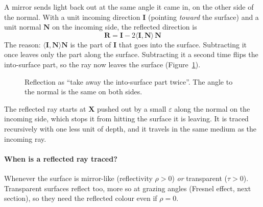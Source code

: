 \documentclass[11pt,a4paper]{article}
\newcommand{\vv}[1]{\mathbf{#1}}
\newcommand{\dotp}[2]{\langle #1, #2\rangle}
\begin{document}
A mirror sends light back out at the same angle it came in, on the other side
of the normal. With a unit incoming direction $\vv I$ (pointing \emph{toward}
the surface) and a unit normal $\vv N$ on the incoming side, the reflected
direction is
\[
  \boxed{\ \vv R = \vv I - 2\dotp{\vv I}{\vv N}\,\vv N\ }
\]
The reason: $\dotp{\vv I}{\vv N}\vv N$ is the part of $\vv I$ that goes into
the surface. Subtracting it once leaves only the part along the surface.
Subtracting it a second time flips the into-surface part, so the ray now leaves
the surface (Figure~\ref{fig:reflect}).

\begin{figure}[h]
\centering
{}
\caption{Reflection as ``take away the into-surface part twice''. The angle to the
normal is the same on both sides.}
\label{fig:reflect}
\end{figure}

The reflected ray starts at $\vv X$ pushed out by a small $\varepsilon$ along
the normal on the incoming side, which stops it from hitting the surface it is
leaving. It is traced recursively with one less unit of depth, and it travels
in the same medium as the incoming ray.

\paragraph{When is a reflected ray traced?} Whenever the surface is mirror-like
(reflectivity $\rho>0$) \emph{or} transparent ($\tau>0$). Transparent surfaces
reflect too, more so at grazing angles (Fresnel effect, next section), so they
need the reflected colour even if $\rho=0$.
\end{document}
